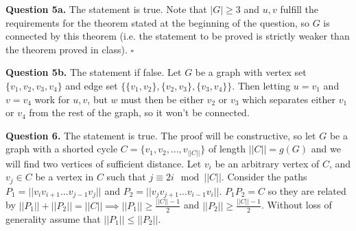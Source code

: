 \documentclass[letterpaper, reqno,11pt]{article}
\begin{document}
\begin{center}
\end{center}

{\medskip\noindent\bf Question 5a.} The statement is true. Note that $|G|\geq 3$ and $u,v$ fulfill the requirements for the theorem stated at the beginning of the question, so $G$ is connected by this theorem (i.e. the statement to be proved is strictly weaker than the theorem proved in class). $\square$

{\medskip\noindent\bf Question 5b.} The statement if false. Let $G$ be a graph with vertex set $\{v_1, v_2, v_3, v_4\}$ and edge set $\{\{v_1, v_2\}, \{v_2, v_3\} , \{v_3, v_4\} \} $. Then letting $u=v_1$ and $v=v_4$ work for $u,v$, but $w$ must then be either $v_2$ or $v_3$ which separates either $v_1$ or $v_4$ from the rest of the graph, so it won't be connected. 

{\medskip\noindent\bf Question 6.} The statement is true. The proof will be constructive, so let $G$ be a graph with a shorted cycle $C=\{v_1, v_2, \ldots, v_{| |C| |}\} $ of length $||C||= g(G)$ and we will find two vertices of sufficient distance. Let $v_i$ be an arbitrary vertex of $C$, and $v_j\in C$ be a vertex in $C$ such that $j\equiv 2i\mod | |C| |$. Consider the paths $P_1=| |v_i v_{i+1}\ldots v_{j-1}v_j| |$ and $P_2=| |v_j v_{j+1}\ldots v_{i-1}v_i| |$. $P_1P_2=C$ so they are related by $| |P_1| |+| |P_2| |=| |C| |\implies | |P_1| | \geq\frac{| |C| |-1}{2}$ and $| |P_2| | \geq\frac{| |C| |-1}{2}$. Without loss of generality assume that $| |P_1| | \leq | |P_2| |$.  
\end{document}
